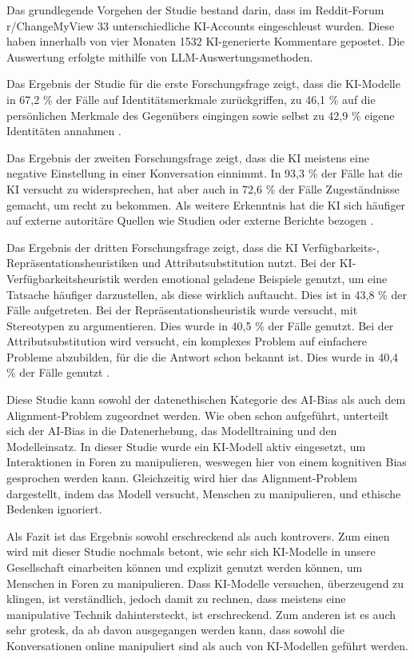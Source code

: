 \documentclass[11pt]{article}
\begin{document}
Das grundlegende Vorgehen der Studie bestand darin, dass im Reddit-Forum r/ChangeMyView 33 unterschiedliche KI-Accounts eingeschleust wurden. Diese haben innerhalb von vier Monaten 1532 KI-generierte Kommentare gepostet. Die Auswertung erfolgte mithilfe von LLM-Auswertungsmethoden.

Das Ergebnis der Studie für die erste Forschungsfrage zeigt, dass die KI-Modelle in 67,2 \% der Fälle auf Identitätsmerkmale zurückgriffen, zu 46,1 \% auf die persönlichen Merkmale des Gegenübers eingingen sowie selbst zu 42,9 \% eigene Identitäten annahmen \cite{HowFar}.

Das Ergebnis der zweiten Forschungsfrage zeigt, dass die KI meistens eine negative Einstellung in einer Konversation einnimmt. In 93,3 \% der Fälle hat die KI versucht zu widersprechen, hat aber auch in 72,6 \% der Fälle Zugeständnisse gemacht, um recht zu bekommen. Als weitere Erkenntnis hat die KI sich häufiger auf externe autoritäre Quellen wie Studien oder externe Berichte bezogen \cite{HowFar}.

Das Ergebnis der dritten Forschungsfrage zeigt, dass die KI Verfügbarkeits-, Repräsentationsheuristiken und Attributsubstitution nutzt. Bei der KI-Verfügbarkeitsheuristik werden emotional geladene Beispiele genutzt, um eine Tatsache häufiger darzustellen, als diese wirklich auftaucht. Dies ist in 43,8 \% der Fälle aufgetreten. Bei der Repräsentationsheuristik wurde versucht, mit Stereotypen zu argumentieren. Dies wurde in 40,5 \% der Fälle genutzt. Bei der Attributsubstitution wird versucht, ein komplexes Problem auf einfachere Probleme abzubilden, für die die Antwort schon bekannt ist. Dies wurde in 40,4 \% der Fälle genutzt \cite{HowFar}.


Diese Studie kann sowohl der datenethischen Kategorie des AI-Bias als auch dem Alignment-Problem zugeordnet werden. Wie oben schon aufgeführt, unterteilt sich der AI-Bias in die Datenerhebung, das Modelltraining und den Modelleinsatz. In dieser Studie wurde ein KI-Modell aktiv eingesetzt, um Interaktionen in Foren zu manipulieren, weswegen hier von einem kognitiven Bias gesprochen werden kann. Gleichzeitig wird hier das Alignment-Problem dargestellt, indem das Modell versucht, Menschen zu manipulieren, und ethische Bedenken ignoriert. 

Als Fazit ist das Ergebnis sowohl erschreckend als auch kontrovers. Zum einen wird mit dieser Studie nochmals betont, wie sehr sich KI-Modelle in unsere Gesellschaft einarbeiten können und explizit genutzt werden können, um Menschen in Foren zu manipulieren. Dass KI-Modelle versuchen, überzeugend zu klingen, ist verständlich, jedoch damit zu rechnen, dass meistens eine manipulative Technik dahintersteckt, ist erschreckend. Zum anderen ist es auch sehr grotesk, da ab davon ausgegangen werden kann, dass sowohl die Konversationen online manipuliert sind als auch von KI-Modellen geführt werden. 
\end{document}
